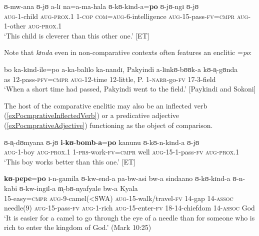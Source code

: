 \begin{exe}
	\ex \gll ʊ-mw-ana ʊ-jʊ a-lɪ na=a-ma-hala ʊ-kʊ-kɪnd-a=\textbf{po} ʊ-jʊ-ngɪ ʊ-jʊ\\
	\textsc{aug}-1-child \textsc{aug}-\textsc{prox.1} 1-\textsc{cop} \textsc{com}=\textsc{aug}-6-intelligence \textsc{aug}-15-pass-\textsc{fv}=\textsc{cmpr} \textsc{aug}-1-other \textsc{aug}-\textsc{prox.1}\\
	\glt \lq This child is cleverer than this other one.' [ET]
\end{exe}
Note that \textit{kɪnda} even in non-comparative contexts often features an enclitic =\textit{po}:
\begin{exe}
	\ex\label{exkindapononcomparative} \gll bo ka-kɪnd-ile=po a-ka-balɪlo ka-nandɪ, Pakyindi a-lɪnkʊ-bʊʊk-a kʊ-n̩-gʊnda\\
	as 12-pass-\textsc{pfv}=\textsc{cmpr} \textsc{aug}-12-time 12-little, P. 1-\textsc{narr}-go-\textsc{fv} 17-3-field\\
	\glt \lq When a short time had passed, Pakyindi went to the field.' [Paykindi and Sokoni]
\end{exe}

The host of the comparative enclitic may also be an inflected verb (\ref{exPocmprativeInflectedVerb}) or a predicative adjective (\ref{exPocmprativeAdjective}) functioning as the object of comparison.
\begin{exe}
	\ex \label{exPocmprativeInflectedVerb}
	\gll ʊ-n̩-dʊmyana ʊ-jʊ \textbf{i}-\textbf{kʊ}-\textbf{bomb}-\textbf{a}=\textbf{po} kanunu ʊ-kʊ-n-kɪnd-a ʊ-jʊ\\
	\textsc{aug}-1-boy \textsc{aug}-\textsc{prox.1} 1-\textsc{prs}-work-\textsc{fv}=\textsc{cmpr} well \textsc{aug}-15-1-pass-\textsc{fv} \textsc{aug}-\textsc{prox.1}\\
	\glt \lq This boy works better than this one.' [ET]
	
	\ex \label{exPocmprativeAdjective}
	\gll \textbf{kʊ}-\textbf{pepe}=\textbf{po} ɪ-n-gamila ʊ-kw-end-a pa-bw-asi bw-a sindaano ʊ-kʊ-kɪnd-a ʊ-n-kabi ʊ-kw-ingɪl-a m̩-bʊ-nyafyale bw-a Kyala\\
	15-easy=\textsc{cmpr} \textsc{aug}-9-camel(<SWA) \textsc{aug}-15-walk/travel-\textsc{fv} 14-gap 14-\textsc{assoc} needle(9) \textsc{aug}-15-pass-\textsc{fv} \textsc{aug}-1-rich \textsc{aug}-15-enter-\textsc{fv} 18-14-chiefdom 14-\textsc{assoc} God\\
	\glt \lq It is easier for a camel to go through the eye of a needle than for someone who is rich to enter the kingdom of God.' (Mark 10:25)
\end{exe}

